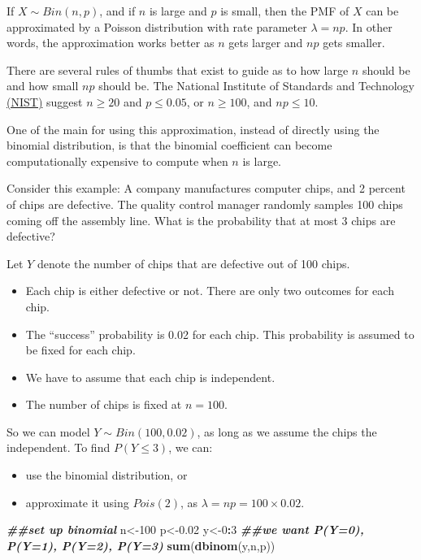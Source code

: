 \documentclass[
]{book}
\newenvironment{Shaded}{\begin{snugshade}}{\end{snugshade}}
\newcommand{\DecValTok}[1]{\textcolor[rgb]{0.00,0.00,0.81}{#1}}
\newcommand{\DocumentationTok}[1]{\textcolor[rgb]{0.56,0.35,0.01}{\textbf{\textit{#1}}}}
\newcommand{\FloatTok}[1]{\textcolor[rgb]{0.00,0.00,0.81}{#1}}
\newcommand{\FunctionTok}[1]{\textcolor[rgb]{0.13,0.29,0.53}{\textbf{#1}}}
\newcommand{\NormalTok}[1]{#1}
\newcommand{\OtherTok}[1]{\textcolor[rgb]{0.56,0.35,0.01}{#1}}
\newcommand{\SpecialCharTok}[1]{\textcolor[rgb]{0.81,0.36,0.00}{\textbf{#1}}}
\providecommand{\tightlist}{%
  \setlength{\itemsep}{0pt}\setlength{\parskip}{0pt}}
\begin{document}
If \(X \sim Bin(n,p)\), and if \(n\) is large and \(p\) is small, then the PMF of \(X\) can be approximated by a Poisson distribution with rate parameter \(\lambda = np\). In other words, the approximation works better as \(n\) gets larger and \(np\) gets smaller.

There are several rules of thumbs that exist to guide as to how large \(n\) should be and how small \(np\) should be. The National Institute of Standards and Technology \href{https://www.itl.nist.gov/div898/handbook/pmc/section3/pmc331.htm}{(NIST)} suggest \(n \geq 20\) and \(p \leq 0.05\), or \(n \geq 100\), and \(np \leq 10\).

One of the main for using this approximation, instead of directly using the binomial distribution, is that the binomial coefficient can become computationally expensive to compute when \(n\) is large.

Consider this example: A company manufactures computer chips, and 2 percent of chips are defective. The quality control manager randomly samples 100 chips coming off the assembly line. What is the probability that at most 3 chips are defective?

Let \(Y\) denote the number of chips that are defective out of 100 chips.

\begin{itemize}
\tightlist
\item
  Each chip is either defective or not. There are only two outcomes for each chip.
\item
  The ``success'' probability is 0.02 for each chip. This probability is assumed to be fixed for each chip.
\item
  We have to assume that each chip is independent.
\item
  The number of chips is fixed at \(n=100\).
\end{itemize}

So we can model \(Y \sim Bin(100,0.02)\), as long as we assume the chips the independent. To find \(P(Y \leq 3)\), we can:

\begin{itemize}
\tightlist
\item
  use the binomial distribution, or
\item
  approximate it using \(Pois(2)\), as \(\lambda = np = 100 \times 0.02\).
\end{itemize}

\begin{Shaded}
\begin{Highlighting}[]
\DocumentationTok{\#\#set up binomial}
\NormalTok{n}\OtherTok{\textless{}{-}}\DecValTok{100} 
\NormalTok{p}\OtherTok{\textless{}{-}}\FloatTok{0.02} 
\NormalTok{y}\OtherTok{\textless{}{-}}\DecValTok{0}\SpecialCharTok{:}\DecValTok{3} \DocumentationTok{\#\#we want P(Y=0), P(Y=1), P(Y=2), P(Y=3)}
\FunctionTok{sum}\NormalTok{(}\FunctionTok{dbinom}\NormalTok{(y,n,p))}
\end{Highlighting}
\end{Shaded}
\end{document}
